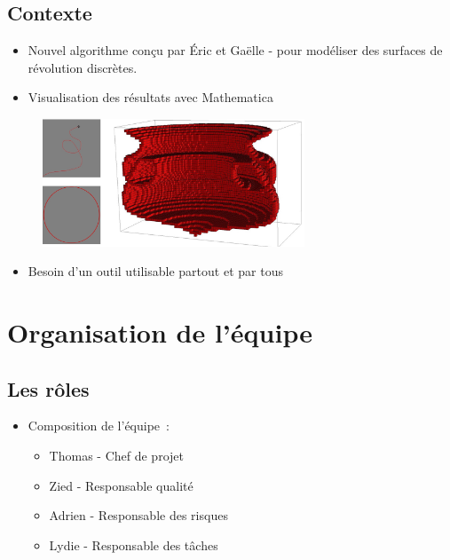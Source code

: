 \documentclass{beamer}
\begin{document}
	\subsection{Contexte}
	\begin{frame}{\subsecname}
		\begin{itemize}
			\item Nouvel algorithme conçu par \'Eric  et
				Gaëlle - pour mod\'eliser
				des surfaces de r\'evolution discrètes.
			\item Visualisation des r\'esultats avec Mathematica
		\end{itemize}
		\begin{figure}
			\includegraphics[height=3.8cm]{../Images/revolution2.jpg}
		\end{figure}
		\begin{itemize}
			\item Besoin d'un outil utilisable partout et par tous
		\end{itemize}
	\end{frame}
	



\section{Organisation de l'\'equipe}


	 \subsection{Les r\^oles}
	 \begin{frame}{\subsecname}
		\begin{itemize}
			\item Composition de l'\'equipe~:
				\begin{itemize}
					\item Thomas  - Chef de projet
					\item Zied   - Responsable
						qualit\'e
					\item Adrien  - Responsable des risques
					\item Lydie  - Responsable des t\^aches
				\end{itemize}
		\end{itemize}
	\end{frame}
\end{document}
